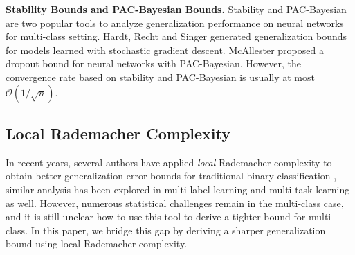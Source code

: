 \documentclass{article}
\begin{document}
\textbf{Stability Bounds and PAC-Bayesian Bounds.}
    Stability \cite{Hardt2016} and PAC-Bayesian \cite{McAllester2013} are two popular tools
    to analyze generalization performance on neural networks for multi-class setting.
    Hardt, Recht and Singer \cite{Hardt2016} generated generalization bounds
    for models learned with stochastic gradient descent.
     McAllester \cite{McAllester2013} proposed a dropout bound for neural networks with  PAC-Bayesian.
    However, the convergence rate based on stability and PAC-Bayesian is usually at most $\mathcal{O}(1/\sqrt{n})$.


\subsection{Local Rademacher Complexity}
In recent years,
several authors have applied
 \emph{local} Rademacher complexity to obtain  better generalization error bounds
for traditional binary classification \cite{Bartlett2005lrc,Koltchinskii2006lrcoiirm,Liu2015er,Liu2017ep},
similar analysis has been explored in multi-label learning \cite{xu2016local} and multi-task learning \cite{Yousefi2016} as well.
However,
numerous statistical challenges remain in the multi-class case, and it is still unclear how to use
this tool to derive a tighter bound for multi-class.
In this paper,
we bridge this gap by deriving a sharper generalization bound using local Rademacher complexity.
\end{document}
